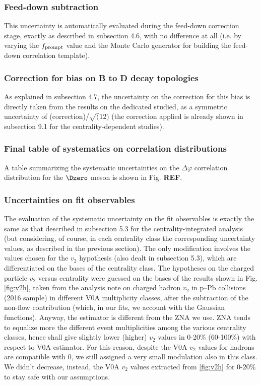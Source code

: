 \subsubsection{Feed-down subtraction}
This uncertainty is automatically evaluated during the feed-down correction stage, exactly as described in subsection 4.6, with no difference at all (i.e. by varying the $f_{\rm prompt}$ value and the Monte Carlo generator for building the feed-down correlation template).

\subsubsection{Correction for bias on B to D decay topologies}
As explained in subsection 4.7, the uncertainty on the correction for this bias is directly taken from the results on the dedicated studied, as a symmetric uncertainty of (correction)/$\sqrt(12)$ (the correction applied is already shown in subsection 9.1 for the centrality-dependent studies).

\subsubsection{Final table of systematics on correlation distributions}
A table summarizing the systematic uncertainties on the $\Delta\varphi$ correlation distribution for the $\Dzero$ meson is shown in Fig. {\bf REF}.

\subsubsection{Uncertainties on fit observables}
The evaluation of the systematic uncertainty on the fit observables is exactly the same as that described in subsection 5.3 for the centrality-integrated analysis (but considering, of course, in each centrality class the corresponding uncertainty values, as described in the previous section).
The only modification involves the values chosen for the $v_2$ hypothesis (also dealt in subsection 5.3), which are differentiated on the bases of the centrality class.
The hypotheses on the charged particle $v_2$ versus centrality were guessed on the bases of the results shown in Fig. \ref{fig:v2h}, taken from the analysis note on charged hadron $v_2$ in p--Pb collisions (2016 sample) in different V0A multiplicity classes, after the subtraction of the non-flow contribution (which, in our fits, we account with the Gaussian functions). Anyway, the estimator is different from the ZNA we use. ZNA tends to equalize more the different event multiplicities among the various centrality classes, hence shall give slightly lower (higher) $v_2$ values in 0-20\% (60-100\%) with respect to V0A estimator. For this reason, despite the V0A $v_2$ values for hadrons are compatible with 0, we still assigned a very small modulation also in this class. We didn't decrease, instead, the V0A $v_2$ values extracted from \ref{fig:v2h} for 0-20\% to stay safe with our assumptions.

